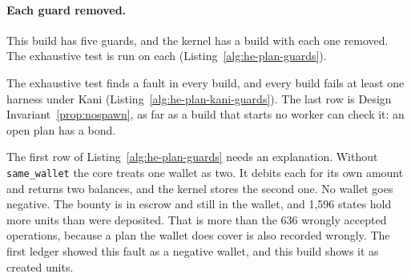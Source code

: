 
\paragraph{Each guard removed.}
This build has five guards, and the kernel has a build with each one
removed. The exhaustive test is run on each
(Listing~\ref{alg:he-plan-guards}).


The exhaustive test finds a fault in every build, and every build fails at
least one harness under Kani (Listing~\ref{alg:he-plan-kani-guards}). The
last row is Design Invariant~\ref{prop:nospawn}, as far as a build that
starts no worker can check it: an open plan has a bond.


The first row of Listing~\ref{alg:he-plan-guards} needs an explanation.
Without \texttt{same\_wallet} the core treats one wallet as two. It debits
each for its own amount and returns two balances, and the kernel stores
the second one. No wallet goes negative. The bounty is in escrow and still
in the wallet, and 1,596 states hold more units than were deposited. That
is more than the 636 wrongly accepted operations, because a plan the
wallet does cover is also recorded wrongly. The first ledger showed this
fault as a negative wallet, and this build shows it as created units.


